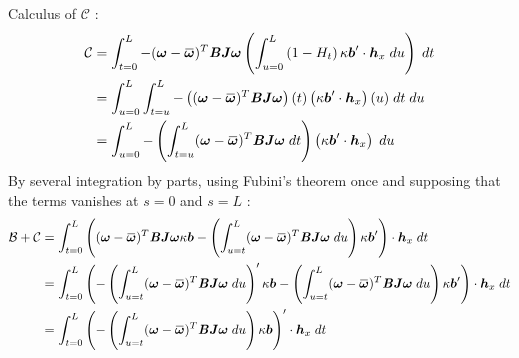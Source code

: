 Calculus of $\mathcal{C}$ :
\begin{equation}
	\begin{aligned}
	\mathcal{C} &=
	\int_{t=0}^{L} -(\vect{\omega} - \overbar{\vect{\omega}})^T \mat{B}\mat{J}\vect{\omega}
	\left(\int_{u=0}^L \left(1-H_t\right)\kappa\vect{b}'\cdot  \vect{h}_x \;du\right)
	\;dt
	\\
	&=
	\int_{u=0}^{L}\int_{t=u}^{L}-\left((\vect{\omega} - \overbar{\vect{\omega}})^T \mat{B}\mat{J}\vect{\omega}\right)(t)
	\left(\kappa\vect{b}'\cdot \vect{h}_x\right)(u) \;dt\;du
	\\
	&=
	\int_{u=0}^{L}-\left(\int_{t=u}^{L}(\vect{\omega} - \overbar{\vect{\omega}})^T \mat{B}\mat{J}\vect{\omega}\;dt\right)
	\left(\kappa\vect{b}'\cdot \vect{h}_x\right)\;du
	\\
	\end{aligned} 
\end{equation}
By several integration by parts, using Fubini’s theorem once and supposing that the terms vanishes at $s=0$ and $s=L$ :
\begin{equation}
	\begin{aligned} 
	\mathcal{B}+\mathcal{C} &=
	\int_{t=0}^{L} \left(
	(\vect{\omega} - \overbar{\vect{\omega}})^T \mat{B}\mat{J}\vect{\omega}
	\kappa\vect{b}
	-
	\left(\int_{u=t}^{L}(\vect{\omega} - \overbar{\vect{\omega}})^T \mat{B}\mat{J}\vect{\omega}\;du\right)
	\kappa\vect{b}'
	\right)\cdot \vect{h}_x \;dt\\
	&=
	\int_{t=0}^{L} \left(
	-\left(\int_{u=t}^{L}(\vect{\omega} - \overbar{\vect{\omega}})^T \mat{B}\mat{J}\vect{\omega}\;du\right)'
	\kappa\vect{b}
	-
	\left(\int_{u=t}^{L}(\vect{\omega} - \overbar{\vect{\omega}})^T \mat{B}\mat{J}\vect{\omega}\;du\right)
	\kappa\vect{b}'
	\right)\cdot \vect{h}_x \;dt\\
	&=
	\int_{t=0}^{L} \left(
	-\left(\int_{u=t}^{L}(\vect{\omega} - \overbar{\vect{\omega}})^T \mat{B}\mat{J}\vect{\omega}\;du\right)
	\kappa\vect{b}
	\right)'\cdot \vect{h}_x \;dt\\
	\end{aligned} 
\end{equation}

